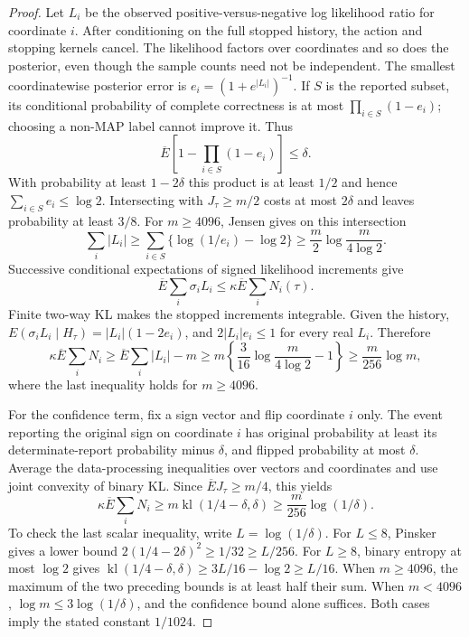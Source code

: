 \documentclass[11pt]{article}
\theoremstyle{remark}
\begin{document}
\begin{proof}
Let $L_i$ be the observed positive-versus-negative log likelihood ratio for
coordinate $i$. After conditioning on the full stopped history, the action
and stopping kernels cancel. The likelihood factors over coordinates and so
does the posterior, even though the sample counts need not be independent.
The smallest coordinatewise posterior error is
$e_i=(1+e^{|L_i|})^{-1}$. If $S$ is the reported subset, its conditional
probability of complete correctness is at most $\prod_{i\in S}(1-e_i)$;
choosing a non-MAP label cannot improve it. Thus
\[
 \overline E\left[1-\prod_{i\in S}(1-e_i)\right]\le\delta.
\]
With probability at least $1-2\delta$ this product is at least $1/2$ and hence
$\sum_{i\in S}e_i\le\log2$. Intersecting with $J_\tau\ge m/2$ costs at most
$2\delta$ and leaves probability at least $3/8$. For $m\ge4096$, Jensen gives
on this intersection
\[
 \sum_i|L_i|\ge\sum_{i\in S}\{\log(1/e_i)-\log2\}
 \ge\frac m2\log\frac{m}{4\log2}.
\]
Successive conditional expectations of signed likelihood increments give
\[
 \overline E\sum_i\sigma_iL_i\le\kappa\overline E\sum_iN_i(\tau).
\]
Finite two-way KL makes the stopped increments integrable. Given the history,
$E(\sigma_iL_i\mid H_\tau)=|L_i|(1-2e_i)$, and
$2|L_i|e_i\le1$ for every real $L_i$. Therefore
\[
 \kappa\overline E\sum_iN_i\ge\overline E\sum_i|L_i|-m
 \ge m\left\{\frac3{16}\log\frac{m}{4\log2}-1\right\}
 \ge\frac m{256}\log m,
\]
where the last inequality holds for $m\ge4096$.

For the confidence term, fix a sign vector and flip coordinate $i$ only.
The event reporting the original sign on coordinate $i$ has original
probability at least its determinate-report probability minus $\delta$, and
flipped probability at most $\delta$. Average the data-processing inequalities
over vectors and coordinates and use joint convexity of binary KL.
Since $\overline EJ_\tau\ge m/4$, this yields
\[
 \kappa\overline E\sum_iN_i\ge
 m\operatorname{kl}(1/4-\delta,\delta)
 \ge\frac m{256}\log(1/\delta).
\]
To check the last scalar inequality, write $L=\log(1/\delta)$. For $L\le8$,
Pinsker gives a lower bound $2(1/4-2\delta)^2\ge1/32\ge L/256$.
For $L\ge8$, binary entropy at most $\log2$ gives
$\operatorname{kl}(1/4-\delta,\delta)\ge3L/16-\log2\ge L/16$.
When $m\ge4096$, the maximum of the two preceding bounds is at least half
their sum. When $m<4096$, $\log m\le3\log(1/\delta)$, and the confidence
bound alone suffices. Both cases imply the stated constant $1/1024$.
\end{proof}
\end{document}
